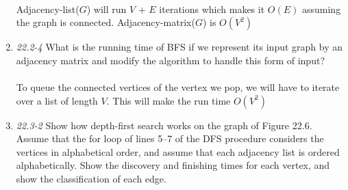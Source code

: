 \documentclass[]{memoir}
\begin{document}
\begin{enumerate}
\paragraph{}
Adjacency-list($G$) will run $V$ + $E$ iterations which makes it $O(E)$ assuming the graph is connected.  Adjacency-matrix($G$) is $O(V^{2})$
\pagebreak
\item \textit{22.2-4} What is the running time of BFS if we represent its input graph by an adjacency matrix and modify the algorithm to handle this form of input?
\paragraph{}
To queue the connected vertices of the vertex we pop, we will have to iterate over a list of length $V$. This will make the run time $O(V^{2})$
\item \textit{22.3-2} Show how depth-first search works on the graph of Figure 22.6.  Assume that the for loop of lines 5–7 of the DFS procedure considers the vertices in alphabetical order,  and  assume  that  each  adjacency  list  is  ordered  alphabetically.   Show  the discovery and finishing times for each vertex, and show the classification of each edge.

\end{enumerate}
\end{document}
